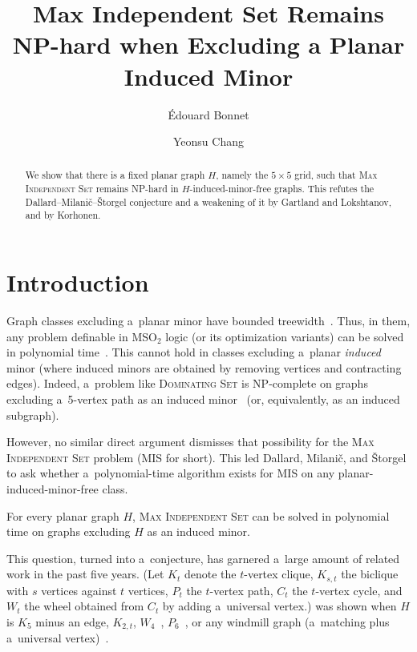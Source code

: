 \documentclass[a4paper,UKenglish,cleveref,autoref]{lipics-v2021}
\title{Max Independent Set Remains NP-hard when Excluding a Planar Induced Minor}
\author{\'{E}douard Bonnet}{CNRS, ENS de Lyon, Université Claude Bernard Lyon 1, LIP UMR 5668, Lyon, France \and \url{http://perso.ens-lyon.fr/edouard.bonnet}}{edouard.bonnet@ens-lyon.fr}{https://orcid.org/0000-0002-1653-5822}{}
\author{Yeonsu Chang}{Department of Mathematics, Hanyang University, Seoul, South Korea \and \url{yeonsuchang.com}}{yeonsu@hanyang.ac.kr}{}{}
\newcommand{\msot}{\textsf{MSO$_2$}\xspace}
\newcommand{\mis}{\textsc{Max Independent Set}\xspace}
\newcommand{\smis}{\textsc{MIS}\xspace}
\begin{document}
\maketitle

\begin{abstract}
  We show that there is a fixed planar graph $H$, namely the $5 \times 5$ grid, such that \textsc{Max Independent Set} remains NP-hard in $H$-induced-minor-free graphs.
  This refutes the Dallard--Milanič--Štorgel conjecture and a weakening of it by Gartland and Lokshtanov, and by Korhonen.
\end{abstract}

\section{Introduction}\label{sec:intro}

Graph classes excluding a~planar minor have bounded treewidth~\cite{RobertsonS86}.
Thus, in them, any problem definable in \msot logic (or its optimization variants) can be solved in polynomial time~\cite{Courcelle90}.
This cannot hold in classes excluding a~planar \emph{induced} minor (where induced minors are obtained by removing vertices and contracting edges).
Indeed, a~problem like \textsc{Dominating Set} is NP-complete on graphs excluding a~5-vertex path as an induced minor~\cite{Bertossi84} (or, equivalently, as an induced subgraph).

However, no similar direct argument dismisses that possibility for the \mis problem (\smis for short).
This led Dallard, Milanič, and Štorgel to ask whether a~polynomial-time algorithm exists for \smis on any planar-induced-minor-free class.

\begin{conjecture}\label{conj:dms}
For every planar graph $H$, \mis can be solved in polynomial time on graphs excluding $H$ as an induced minor.
\end{conjecture}

This question, turned into a~conjecture, has garnered a~large amount of related work in the past five years.
(Let $K_t$ denote the $t$-vertex clique, $K_{s,t}$ the biclique with $s$ vertices against $t$ vertices, $P_t$ the $t$-vertex path, $C_t$ the $t$-vertex cycle, and $W_t$ the wheel obtained from $C_t$ by adding a~universal vertex.)
 was shown when $H$ is $K_5$ minus an edge, $K_{2,t}$, $W_4$~\cite{DallardMS24a}, $P_6$~\cite{Grzesik22}, or any windmill graph (a~matching plus a~universal vertex)~\cite{BonnetDGTW26}.
\end{document}
